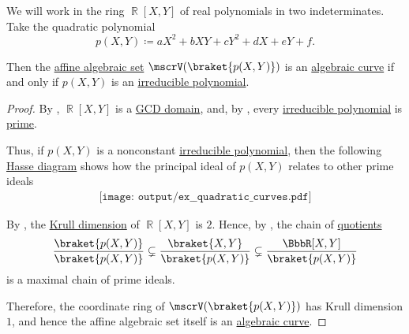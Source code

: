 \begin{proposition}\label{thm:quadratic_curves}
  We will work in the ring \( \BbbR[X, Y] \) of real polynomials in two indeterminates. Take the quadratic polynomial
  \begin{equation*}
    p(X, Y) \coloneqq a X^2 + b XY + c Y^2 + d X + e Y + f.
  \end{equation*}

  Then the \hyperref[def:affine_algebraic_set]{affine algebraic set} \( \mscrV(\braket{ p(X, Y) }) \) is an \hyperref[def:affine_algebraic_set/variety]{algebraic curve} if and only if \( p(X, Y) \) is an \hyperref[def:domain_divisibility/irreducible]{irreducible polynomial}.
\end{proposition}
\begin{proof}
  By , \( \BbbR[X, Y] \) is a \hyperref[def:gcd_domain]{GCD domain}, and, by , every \hyperref[def:domain_divisibility/irreducible]{irreducible polynomial} is \hyperref[def:domain_divisibility/prime]{prime}.

  Thus, if \( p(X, Y) \) is a nonconstant \hyperref[def:domain_divisibility/irreducible]{irreducible polynomial}, then the following \hyperref[def:hasse_diagram]{Hasse diagram} shows how the principal ideal of \( p(X, Y) \) relates to other prime ideals
  \begin{equation*}
    \begin{aligned}
      \texttt{[image: output/ex\_\_quadratic\_curves.pdf]}
    \end{aligned}
  \end{equation*}

  By , the \hyperref[def:krull_dimension]{Krull dimension} of \( \BbbR[X, Y] \) is \( 2 \). Hence, by , the chain of \hyperref[def:ring/quotient]{quotients}
  \begin{equation*}
    \frac {\braket{ p(X, Y) }} {\braket{ p(X, Y) }} \subsetneq \frac {\braket{ X, Y }} {\braket{ p(X, Y) }} \subsetneq \frac {\BbbR[X, Y]} {\braket{ p(X, Y) }}
  \end{equation*}
  is a maximal chain of prime ideals.

  Therefore, the coordinate ring of \( \mscrV(\braket{ p(X, Y) }) \) has Krull dimension \( 1 \), and hence the affine algebraic set itself is an \hyperref[def:affine_algebraic_set/curve]{algebraic curve}.
\end{proof}
